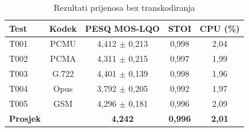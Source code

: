 \begin{table}[htbp]
\centering
\caption{Rezultati prijenosa bez transkodiranja}
\label{tab:passthrough-details}
\begin{tabular}{|l|c|c|c|c|}
\hline
\textbf{Test} & \textbf{Kodek} & \textbf{PESQ MOS-LQO} & \textbf{STOI} & \textbf{CPU (\%)} \\
\hline
T001 & PCMU & 4,412 $\pm$ 0,213 & 0,998 & 2,04 \\
T002 & PCMA & 4,311 $\pm$ 0,215 & 0,997 & 1,99 \\
T003 & G.722 & 4,401 $\pm$ 0,139 & 0,998 & 1,96 \\
T004 & Opus & 3,792 $\pm$ 0,205 & 0,992 & 1,97 \\
T005 & GSM & 4,296 $\pm$ 0,181 & 0,996 & 2,09 \\
\hline
\textbf{Prosjek} & & \textbf{4,242} & \textbf{0,996} & \textbf{2,01} \\
\hline
\end{tabular}
\end{table}
